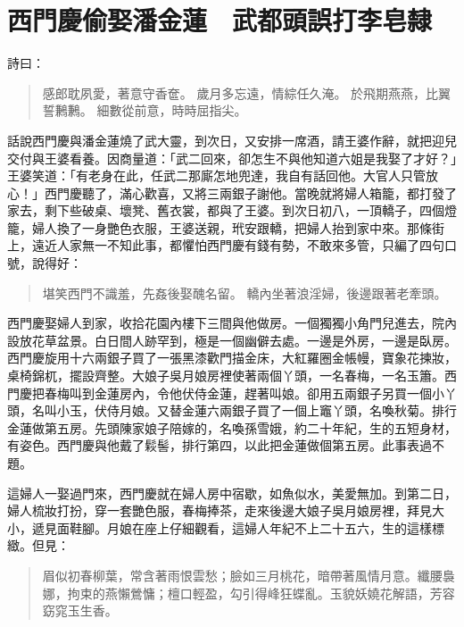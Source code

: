 
\chapter{西門慶偷娶潘金蓮　武都頭誤打李皂隸}

詩曰：
\begin{quote}
感郎耽夙愛，著意守香奩。
歲月多忘遠，情綜任久淹。
於飛期燕燕，比翼誓鶼鶼。
細數從前意，時時屈指尖。
\end{quote}

話說西門慶與潘金蓮燒了武大靈，到次日，又安排一席酒，請王婆作辭，就把迎兒交付與王婆看養。因商量道：「武二回來，卻怎生不與他知道六姐是我娶了才好？」王婆笑道：「有老身在此，任武二那廝怎地兜達，我自有話回他。大官人只管放心！」西門慶聽了，滿心歡喜，又將三兩銀子謝他。當晚就將婦人箱籠，都打發了家去，剩下些破桌、壞凳、舊衣裳，都與了王婆。到次日初八，一頂轎子，四個燈籠，婦人換了一身艷色衣服，王婆送親，玳安跟轎，把婦人抬到家中來。那條街上，遠近人家無一不知此事，都懼怕西門慶有錢有勢，不敢來多管，只編了四句口號，說得好：
\begin{quote}
堪笑西門不識羞，先姦後娶醜名留。
轎內坐著浪淫婦，後邊跟著老牽頭。
\end{quote}

西門慶娶婦人到家，收拾花園內樓下三間與他做房。一個獨獨小角門兒進去，院內設放花草盆景。白日間人跡罕到，極是一個幽僻去處。一邊是外房，一邊是臥房。西門慶旋用十六兩銀子買了一張黑漆歡門描金床，大紅羅圈金帳幔，寶象花揀妝，桌椅錦杌，擺設齊整。大娘子吳月娘房裡使著兩個丫頭，一名春梅，一名玉簫。西門慶把春梅叫到金蓮房內，令他伏侍金蓮，趕著叫娘。卻用五兩銀子另買一個小丫頭，名叫小玉，伏侍月娘。又替金蓮六兩銀子買了一個上竈丫頭，名喚秋菊。排行金蓮做第五房。先頭陳家娘子陪嫁的，名喚孫雪娥，約二十年紀，生的五短身材，有姿色。西門慶與他戴了鬏髻，排行第四，以此把金蓮做個第五房。此事表過不題。

這婦人一娶過門來，西門慶就在婦人房中宿歇，如魚似水，美愛無加。到第二日，婦人梳妝打扮，穿一套艷色服，春梅捧茶，走來後邊大娘子吳月娘房裡，拜見大小，遞見面鞋腳。月娘在座上仔細觀看，這婦人年紀不上二十五六，生的這樣標緻。但見：
\begin{quote}
眉似初春柳葉，常含著雨恨雲愁；臉如三月桃花，暗帶著風情月意。纖腰裊娜，拘束的燕懶鶯慵；檀口輕盈，勾引得峰狂蝶亂。玉貌妖嬈花解語，芳容窈窕玉生香。
\end{quote}

